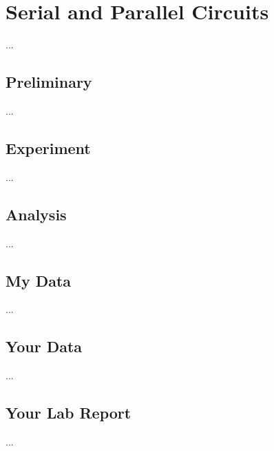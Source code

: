 \chapter{Serial and Parallel Circuits}
...
\section{Preliminary}
...
\section{Experiment}
...
\section{Analysis}
...
\section{My Data}
...
\section{Your Data}
...
\section{Your Lab Report}
...